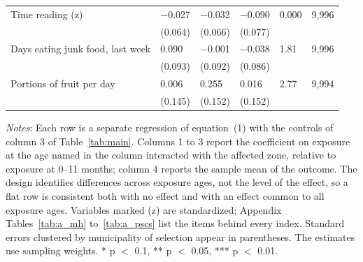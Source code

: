 \begin{table}[htbp]
\begin{minipage}{460pt}
{\begin{tabular*}{460pt}{@{}p{200pt}@{\extracolsep{\fill}}lllll@{}}
Time reading (z) & $-$0.027 & $-$0.032 & $-$0.090 & 0.000 & 9,996 \\
 & (0.064) & (0.066) & (0.077) & & \\
Days eating junk food, last week & 0.090 & $-$0.001 & $-$0.038 & 1.81 & 9,996 \\
 & (0.093) & (0.092) & (0.086) & & \\
Portions of fruit per day & 0.006 & 0.255\sym{*} & 0.016 & 2.77 & 9,994 \\
 & (0.145) & (0.152) & (0.152) & & \\
\bottomrule
\end{tabular*}\par}
\vspace{4pt}
{\footnotesize
\textit{Notes}: Each row is a separate regression of equation~(1) with the controls of column 3 of Table~\ref{tab:main}. Columns 1 to 3 report the coefficient on exposure at the age named in the column interacted with the affected zone, relative to exposure at 0--11 months; column 4 reports the sample mean of the outcome. The design identifies differences across exposure ages, not the level of the effect, so a flat row is consistent both with no effect and with an effect common to all exposure ages. Variables marked (z) are standardized; Appendix Tables~\ref{tab:a_mh} to~\ref{tab:a_pscs} list the items behind every index. Standard errors clustered by municipality of selection appear in parentheses. The estimates use sampling weights. * p $<$ 0.1, ** p $<$ 0.05, *** p $<$ 0.01.
\par}
\end{minipage}
\end{table}
